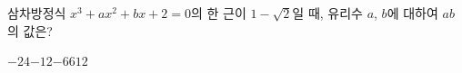 삼차방정식 $x^3+ax^2+bx+2=0$의 한 근이 $1-\sqrt{2}$일 때, 유리수 $a$, $b$에 대하여 $ab$의 값은?
\begin{choices32}{$-24$}{$-12$}{$-6$}{$6$}{$12$}\end{choices32}
